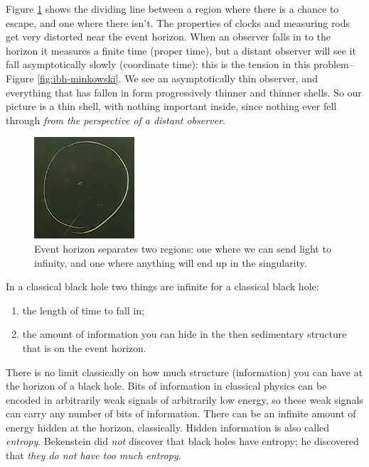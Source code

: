 \documentclass[]{article}
\begin{document}
{\begin{appendices}
	Figure \ref{fig:ibh-horizon} shows the dividing line between a region where there is a chance to escape, and one where there isn't. The properties of clocks and measuring rods get very distorted near the event horizon. When an observer falls in to the horizon it measures a finite time (proper time), but a distant observer will see it fall asymptotically slowly (coordinate time): this is the tension in this problem--Figure \ref{fig:ibh-minkowski}. We see an asymptotically thin observer, and everything that has fallen in form progressively thinner and thinner shells. So our picture is a thin shell, with nothing important inside, since nothing ever fell through \emph{from the perspective of a distant observer}.
	\begin{figure}[H]
		\begin{center}
			\caption[Event horizon separates two regions]{Event horizon separates two regions: one where we can send light to infinity, and one where anything will end up in the singularity.}\label{fig:ibh-horizon}
			\includegraphics{ibh-horizon}
		\end{center}
	\end{figure}

	In a classical black hole two things are infinite for a classical black hole:
	\begin{enumerate}
		\item the length of time to fall in;
		\item the amount of information you can hide in the then sedimentary structure that is on the event horizon.
	\end{enumerate}

	There is no limit classically on how much structure (information) you can have at the horizon of a black hole. Bits of information in classical physics can be encoded in arbitrarily weak signals of arbitrarily low energy, so these weak signals can carry any number of bits of information. There can be an infinite amount of energy hidden at the horizon, classically. Hidden information is also called \emph{entropy}.
	Bekenstein did \emph{not} discover that black holes have entropy; he discovered that \emph{they do not have too much entropy}.
	

\end{appendices}}
\end{document}
